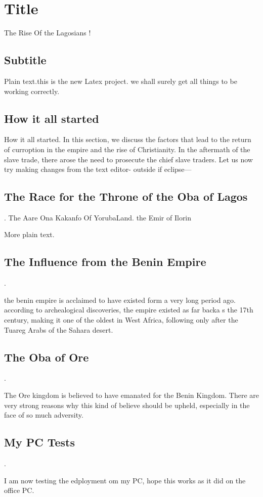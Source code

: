 \documentclass{article}
\begin{document}
\section{Title}The Rise Of the Lagosians !

\subsection{Subtitle}

Plain text.this is the new Latex project. we shall surely get all things to be
working correctly.

\subsection{How it all started}How it all started. In this section, we discuss
the factors that lead to the return of curroption in the empire and the rise of
Christianity. In the aftermath of the slave trade, there arose the need to
prosecute the chief slave traders.
Let us now try making changes from the text editor- outside if eclipse---


\subsection{The Race for the Throne of the Oba of Lagos}. The
Aare Ona Kakanfo Of YorubaLand. the Emir of Ilorin

More plain text.


\subsection{ The Influence from the Benin Empire}.

the benin empire is acclaimed to have existed form a very long period ago. according to archealogical discoveries, the empire existed as far backa s the 17th century, making it one of the oldest in West Africa, following only after the Tuareg Arabs of the Sahara desert.

\subsection{ The Oba of Ore}. 

The Ore kingdom is believed to have emanated for the Benin Kingdom. There are very strong reasons why this kind of believe should be upheld, especially in the face of so much adversity. 

\subsection{ My PC Tests}. 

I am now testing the edployment om my PC, hope this works as it did on the office PC.
\end{document}
